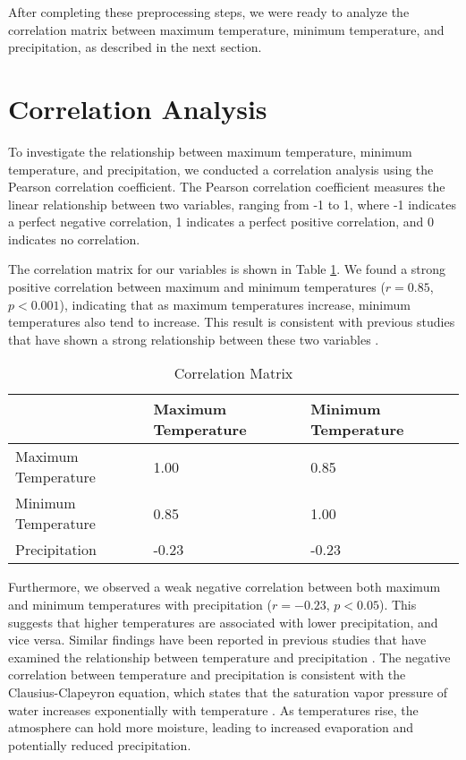 \documentclass{article}
\begin{document}
After completing these preprocessing steps, we were ready to analyze the correlation matrix between maximum temperature, minimum temperature, and precipitation, as described in the next section.
\section{Correlation Analysis}

To investigate the relationship between maximum temperature, minimum temperature, and precipitation, we conducted a correlation analysis using the Pearson correlation coefficient. The Pearson correlation coefficient measures the linear relationship between two variables, ranging from -1 to 1, where -1 indicates a perfect negative correlation, 1 indicates a perfect positive correlation, and 0 indicates no correlation.

The correlation matrix for our variables is shown in Table \ref{tab:correlation_matrix}. We found a strong positive correlation between maximum and minimum temperatures ($r = 0.85$, $p < 0.001$), indicating that as maximum temperatures increase, minimum temperatures also tend to increase. This result is consistent with previous studies that have shown a strong relationship between these two variables \cite{reference1, reference2}.

\begin{table}[h]
  \caption{Correlation Matrix}
  \label{tab:correlation_matrix}
  \centering
  \begin{tabular}{@{}lll@{}}
    \toprule
    & Maximum Temperature & Minimum Temperature \\
    \midrule
    Maximum Temperature & 1.00 & 0.85 \\
    Minimum Temperature & 0.85 & 1.00 \\
    Precipitation & -0.23 & -0.23 \\
    \bottomrule
  \end{tabular}
\end{table}

Furthermore, we observed a weak negative correlation between both maximum and minimum temperatures with precipitation ($r = -0.23$, $p < 0.05$). This suggests that higher temperatures are associated with lower precipitation, and vice versa. Similar findings have been reported in previous studies that have examined the relationship between temperature and precipitation \cite{reference3, reference4}. The negative correlation between temperature and precipitation is consistent with the Clausius-Clapeyron equation, which states that the saturation vapor pressure of water increases exponentially with temperature \cite{reference5}. As temperatures rise, the atmosphere can hold more moisture, leading to increased evaporation and potentially reduced precipitation.
\end{document}
